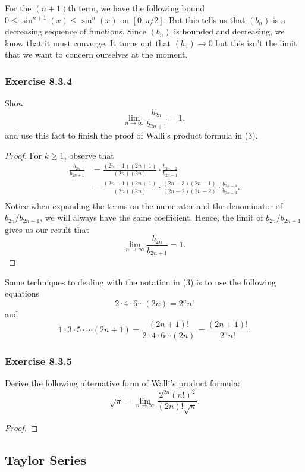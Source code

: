 For the \( (n+1) \)th term, we have the following bound \(  0 \leq \sin^{n+1}(x) \leq \sin^{n}(x)  \) on \( [0, \pi / 2]  \). But this tells us that \( (b_{n})  \) is a decreasing sequence of functions.  Since \( (b_{n}) \) is bounded and decreasing, we know that it must converge. It turns out that \( (b_{n}) \to 0  \) but this isn't the limit that we want to concern ourselves at the moment. 

\subsubsection{Exercise 8.3.4} Show 
\[  \lim_{ n \to \infty  }  \frac{ b_{2n} }{  b_{2n+1} }  = 1,  \] and use this fact to finish the proof of Walli's product formula in (3).
\begin{proof}
For \( k \geq 1  \), observe that
\begin{align*}
  \frac{ b_{2n} }{  b_{2n+1} }   &= \frac{ (2n-1) (2n+1)  }{ (2n)(2n) } \cdot \frac{ b_{2n-2}  }{ b_{2n-1} }   \\
                                 &= \frac{ (2n-1) (2n+1)  }{ (2n)(2n)  } \cdot \frac{ (2n-3) (2n-1)  }{ (2n-2) (2n-2)  } \cdot \frac{ b_{2n-4}  }{ b_{2n-3} } . \\ 
\end{align*}
Notice when expanding the terms on the numerator and the denominator of \( b_{2n} / b_{2n+1} \), we will always have the same coefficient. Hence, the limit of \( b_{2n} / b_{2n+1} \) gives us our result that 
\[  \lim_{ n \to \infty  }  \frac{ b_{2n}  }{  b_{2n+1} } = 1. \]
\end{proof}

Some techniques to dealing with the notation in (3) is to use the following equations 
\[  2 \cdot 4 \cdot 6 \dotsb (2n) = 2^{n} n! \] and
\[  1 \cdot 3 \cdot 5 \cdot \dotsb (2n+1) = \frac{ (2n+1)! }{  2 \cdot 4 \cdot 6 \dotsb (2n)  } = \frac{ (2n+1)! }{ 2^{n} n! }. \]


\subsubsection{Exercise 8.3.5} Derive the following alternative form of Walli's product formula: 
\[  \sqrt{ \pi }  = \lim_{ n \to \infty    }  \frac{ 2^{2n} (n!)^2  }{ (2n)! \sqrt{ n }  }. \]
\begin{proof}
\end{proof}

\subsection{Taylor Series} 


